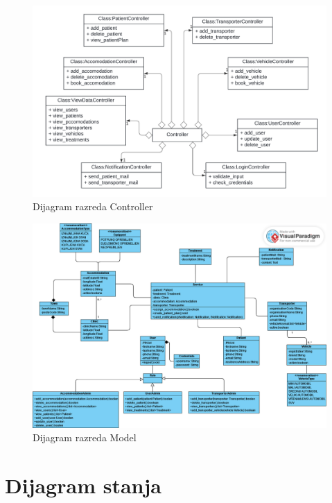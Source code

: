 			\begin{figure}[H]
				\includegraphics[width=\textwidth]{slike/UML_controller.PNG} %
				\caption{Dijagram razreda Controller}
				\label{fig:uml_controller} %
			\end{figure}
			
			\begin{figure}[H]
				\includegraphics[width=\textwidth]{slike/UML_new_model.PNG} %
				\caption{Dijagram razreda Model}
				\label{fig:uml_model} %
			\end{figure}
			\eject
		
		\section{Dijagram stanja}
			
